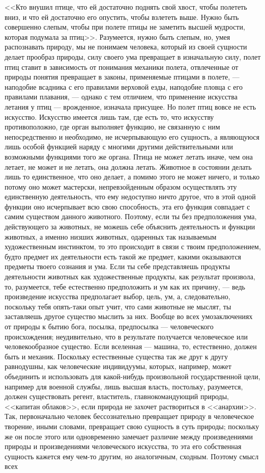 \documentclass[12pt]{article}
\begin{document}
<<Кто внушил птице, что ей достаточно поднять свой хвост, чтобы полететь вниз, и что ей достаточно его опустить, чтобы взлететь выше. Нужно быть совершенно слепым, чтобы при полете птицы не заметить высшей мудрости, которая подумала за птиц>>. Разумеется, нужно быть слепым, но, умея распознавать природу, мы не понимаем человека, который из своей сущности делает прообраз природы, силу своего ума превращает в изначальную силу, полет птиц ставит в зависимость от понимания механики полета, отвлеченные от природы понятия превращает в законы, применяемые птицами в полете, --- наподобие всадника с его правилами верховой езды, наподобие пловца с его правилами плавания, --- однако с тем отличием, что применение искусства летания у птиц --- врожденное, изначала присущее. Но полет птиц вовсе не есть искусство. Искусство имеется лишь там, где есть то, что искусству противоположно, где орган выполняет функцию, не связанную с ним непосредственно и необходимо, не исчерпывающую его сущность, а являющуюся лишь особой функцией наряду с многими другими действительными или возможными функциями того же органа. Птица не может летать иначе, чем она летает, не может и не летать, она должна летать. Животное в состоянии делать лишь то единственное, что оно делает, а помимо этого не может ничего, и только потому оно может мастерски, непревзойденным образом осуществлять эту единственную деятельность, что ему недоступно ничто другое, что в этой одной функции оно исчерпывает всю свою способность, эта его функция совпадает с самим существом данного животного. Поэтому, если ты без предположения ума, действующего за животных, не можешь себе объяснить деятельность и функции животных, а именно низших животных, одаренных так называемым художественным инстинктом, то это происходит в связи с твоим предположением, будто предмет их деятельности есть такой же предмет, какими оказываются предметы твоего сознания и ума. Если ты себе представляешь продукты деятельности животных как художественные продукты, как результат произвола, то, разумеется, тебе естественно предположить и ум как их причину, --- ведь произведение искусства предполагает выбор, цель, ум, а, следовательно, поскольку тебя опять-таки опыт учит, что сами животные не мыслят, ты заставляешь другое существо мыслить за них. Вообще во всех умозаключениях от природы к бытию бога, посылка, предпосылка --- человеческого происхождения; неудивительно, что в результате получается человеческое или человекообразное существо. Если вселенная --- машина, то, естественно, должен быть и механик. Поскольку естественные существа так же друг к другу равнодушны, как человеческие индивидуумы, которых, например, может объединить и использовать для какой-нибудь произвольной государственной цели, например для военной службы, лишь высшая власть, постольку, разумеется, должен существовать регент, властитель, главнокомандующий природы, <<капитан облаков>>, если природа не захочет раствориться в <<анархии>>. Так, первоначально человек бессознательно превращает природу в человеческое творение, иными словами, превращает свою сущность в суть природы; поскольку же он после этого или одновременно замечает различие между произведениями природы и произведениями человеческого искусства, то эта его собственная сущность кажется ему чем-то другим, но аналогичным, сходным. Поэтому смысл всех 
\end{document}
